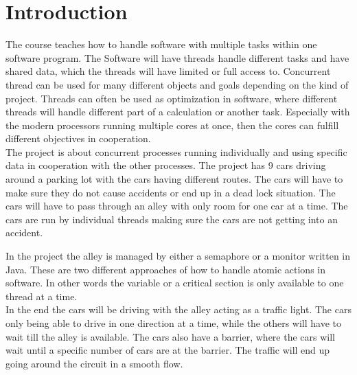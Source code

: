 \section{Introduction}
The course teaches how to handle software with multiple tasks within one software program. The Software will have threads handle different tasks and have shared data, which the threads will have limited or full access to. Concurrent thread can be used for many different objects and goals depending on the kind of project. Threads can often be used as optimization in software, where different threads will handle different part of a calculation or another task. Especially with the modern processors running multiple cores at once, then the cores can fulfill different objectives in cooperation.
\\

The project is about concurrent processes running individually and using specific data in cooperation with the other processes. The project has 9 cars driving around a parking lot with the cars having different routes. The cars will have to make sure they do not cause accidents or end up in a dead lock situation. The cars will have to pass through an alley with only room for one car at a time. The cars are run by individual threads making sure the cars are not getting into an accident. 

In the project the alley is managed by either a semaphore or a monitor written in Java. These are two different approaches of how to handle atomic actions in software. In other words the variable or a critical section is only available to one thread at a time.
\\

In the end the cars will be driving with the alley acting as a traffic light. The cars only being able to drive in one direction at a time, while the others will have to wait till the alley is available. The cars also have a barrier, where the cars will wait until a specific number of cars are at the barrier. The traffic will end up going around the circuit in a smooth flow.